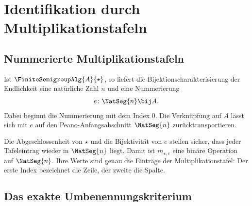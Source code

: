 \documentclass[main.tex]{subfiles}
\begin{document}


\section{Identifikation durch Multiplikationstafeln}

\subsection{Nummerierte Multiplikationstafeln}

Ist \(\FiniteSemigroupAlg{A}{\star}\), so liefert die
Bijektionscharakterisierung der Endlichkeit eine natürliche Zahl \(n\) und
eine Nummerierung
\[
  e\colon\NatSeg{n}\bij A.
\]
Dabei beginnt die Nummerierung mit dem Index \(0\).  Die Verknüpfung auf
\(A\) lässt sich mit \(e\) auf den Peano-Anfangsabschnitt
\(\NatSeg{n}\) zurücktransportieren.


Die Abgeschlossenheit von \(\star\) und die Bijektivität von \(e\)
stellen sicher, dass jeder Tafeleintrag wieder in \(\NatSeg{n}\) liegt.
Damit ist \(m_{\star,e}\) eine binäre Operation auf
\(\NatSeg{n}\).  Ihre Werte sind genau die Einträge der
Multiplikationstafel: Der erste Index bezeichnet die Zeile, der zweite die
Spalte.

\subsection{Das exakte Umbenennungskriterium}
\end{document}
